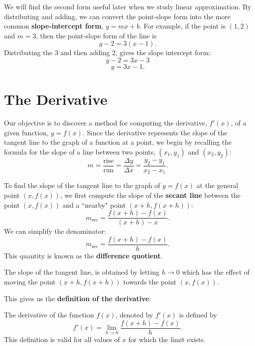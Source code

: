 \documentclass[handout]{ximera}
\begin{document}
We will find the second form useful later when we study linear approximation.
By distributing and adding, we can convert the point-slope form into the more common \textbf{slope-intercept form}, $y = mx + b$.
For example, if the point is $(1,2)$ and $m = 3$, then the point-slope form of the line is 
\[
y - 2 = 3(x - 1).
\]
Distributing the 3 and then adding 2, gives the slope intercept form:
\[
y- 2 = 3x-3
\]
\[
y = 3x - 1.
\]



\section{The Derivative}
Our objective is to discover a method for computing the derivative, $f'(x)$, of a given function, $y = f(x)$.
Since the derivative represents the slope of the tangent line to the graph of a function at a point, 
we begin by recalling the formula for the slope of a line between two points, $(x_1, y_1)$ 
and $(x_2, y_2)$:
\[
m = \frac{\text{rise}}{\text{run}} = \frac{\Delta y}{\Delta x} = \frac{y_2 - y_1}{x_2 - x_1}.
\]

To find the slope of the tangent line to the graph of $y = f(x)$ at the general point $(x, f(x))$, we first 
compute the slope of the \textbf{secant line} between the point $(x, f(x))$ and a 
``nearby" point $(x+h, f(x+h))$:
\[m_{\text{sec}} = \frac{f(x+h) - f(x)}{(x+h)-x}.\]
We can simplify the denominator:
\[m_{\text{sec}} = \frac{f(x+h) - f(x)}{h}.\]
This quantity is known as the \textbf{difference quotient}.

The slope of the tangent line, is obtained by letting $h \to 0$ which has the effect of 
moving the point $(x+h, f(x+h))$ towards the point 
$(x, f(x))$.  


This gives us the \textbf{definition of the derivative}:

\begin{definition}[Derivative]
The derivative of the function $f(x)$, denoted by $f'(x)$ is defined by
\[f'(x) = \lim_{h \to 0} \frac{f(x+h)-f(x)}{h}.\]
This definition is valid for all values of $x$ for which the limit exists.
\end{definition}
\end{document}
